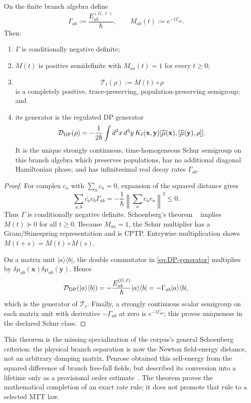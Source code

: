 \documentclass[11pt]{article}
\newcommand{\T}{\mathcal T}
\newcommand{\D}{\mathcal D}
\begin{document}
\begin{theorem}
\label{thm:PenroseSchoenberg}
On the finite branch algebra define
\[
 \Gamma_{ab}:=\frac{E_{ab}^{(G,\ell)}}{\hbar},\qquad
 M_{ab}(t):=e^{-t\Gamma_{ab}}.
\]
Then:
\begin{enumerate}
\item $\Gamma$ is conditionally negative definite;
\item $M(t)$ is positive semidefinite with $M_{aa}(t)=1$ for every $t\geq0$;
\item
\[
 \T_t(\rho):=M(t)\circ\rho
\]
is a completely positive, trace-preserving, population-preserving semigroup; and
\item its generator is the regulated DP generator
\begin{equation}
 \D_{\rm DP}(\rho)=
 -\frac1{2\hbar}\int d^3x\,d^3y\,
 K_\ell(\mathbf x,\mathbf y)
 [\widehat\mu(\mathbf x),[\widehat\mu(\mathbf y),\rho]].
 \label{eq:DP-generator}
\end{equation}
It is the unique strongly continuous, time-homogeneous Schur semigroup on this
branch algebra which preserves populations, has no additional diagonal Hamiltonian
phase, and has infinitesimal real decay rates $\Gamma_{ab}$.
\end{enumerate}
\end{theorem}

\begin{proof}
For complex $c_a$ with $\sum_a c_a=0$, expansion of the squared distance gives
\[
 \sum_{a,b}\overline{c_a}c_b\Gamma_{ab}
 =-\frac{1}{\hbar}\left\|\sum_a c_a r_a\right\|^2\leq0.
\]
Thus $\Gamma$ is conditionally negative definite. Schoenberg's theorem
~\cite{Schoenberg1938} implies $M(t)\succeq0$ for all $t\geq0$.
Because $M_{aa}=1$, the Schur multiplier has a Gram/Stinespring representation and
is CPTP. Entrywise multiplication shows $M(t+s)=M(t)\circ M(s)$.

On a matrix unit $|a\rangle\langle b|$, the double commutator in
\eqref{eq:DP-generator} multiplies by
$\delta\mu_{ab}(\mathbf x)\delta\mu_{ab}(\mathbf y)$. Hence
\[
 \D_{\rm DP}(|a\rangle\langle b|)
 =-\frac{E_{ab}^{(G,\ell)}}{\hbar}|a\rangle\langle b|
 =-\Gamma_{ab}|a\rangle\langle b|,
\]
which is the generator of $\T_t$. Finally, a strongly continuous scalar semigroup
on each matrix unit with derivative $-\Gamma_{ab}$ at zero is
$e^{-t\Gamma_{ab}}$; this proves uniqueness in the declared Schur class.
\end{proof}

This theorem is the missing specialization of the corpus's general Schoenberg
criterion: the physical branch separation is now the Newton field-energy distance,
not an arbitrary damping matrix. Penrose obtained this self-energy from the squared
difference of branch free-fall fields, but described its conversion into a lifetime
only as a provisional order estimate~\cite{Penrose1996}. The theorem proves the
mathematical completion of an exact rate rule; it does not promote that rule to a
selected MTT law.
\end{document}
